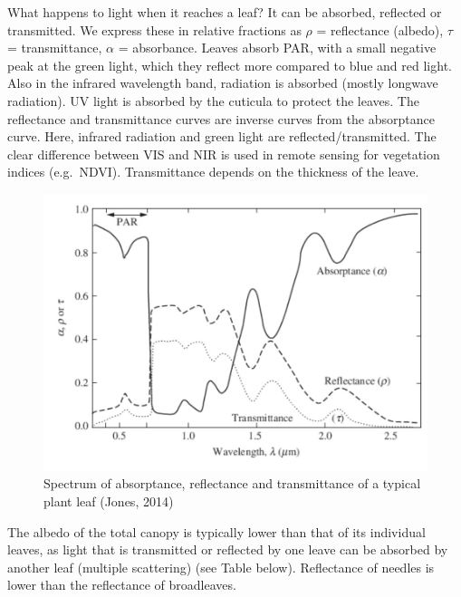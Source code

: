 \documentclass[
  12pt,
  oneside]{book}
\begin{document}
What happens to light when it reaches a leaf? It can be absorbed, reflected or transmitted. We express these in relative fractions as \(\rho\) = reflectance (albedo), \(\tau\) = transmittance, \(\alpha\) = absorbance. Leaves absorb PAR, with a small negative peak at the green light, which they reflect more compared to blue and red light. Also in the infrared wavelength band, radiation is absorbed (mostly longwave radiation). UV light is absorbed by the cuticula to protect the leaves. The reflectance and transmittance curves are inverse curves from the absorptance curve. Here, infrared radiation and green light are reflected/transmitted. The clear difference between VIS and NIR is used in remote sensing for vegetation indices (e.g.~NDVI). Transmittance depends on the thickness of the leave.

\begin{figure}

{\centering \includegraphics[width=0.8\linewidth]{figures/chap3/f37_leaf_optical} 

}

\caption{Spectrum of absorptance, reflectance and transmittance of a typical plant leaf (Jones, 2014)}\label{fig:f37b}
\end{figure}

The albedo of the total canopy is typically lower than that of its individual leaves, as light that is transmitted or reflected by one leave can be absorbed by another leaf (multiple scattering) (see Table below). Reflectance of needles is lower than the reflectance of broadleaves.
\end{document}
